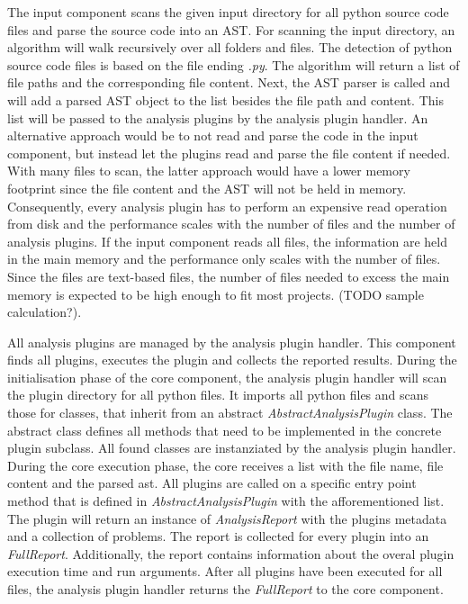 The input component scans the given input directory for all python source code files and parse the source code into an AST. 
For scanning the input directory, an algorithm will walk recursively over all folders and files. The detection of python source code files is based on the file ending \textit{.py}. The algorithm will return a list of file paths and the corresponding file content. 
Next, the AST parser is called and will add a parsed AST object to the list besides the file path and content. This list will be passed to the analysis plugins by the analysis plugin handler.  An alternative approach would be to not read and parse the code in the input component, but instead let the plugins read and parse the file content if needed. With many files to scan, the latter approach would have a lower memory footprint since the file content and the AST will not be held in memory. Consequently, every analysis plugin has to perform an expensive read operation from disk and the performance scales with the number of files and the number of analysis plugins. 
If the input component reads all files, the information are held in the main memory and the performance only scales with the number of files. Since the files are text-based files, the number of files needed to excess the main memory is expected to be high enough to fit most projects. (TODO sample calculation?).

All analysis plugins are managed by the analysis plugin handler. This component finds all plugins, executes the plugin and collects the reported results.
During the initialisation phase of the core component, the analysis plugin handler will scan the plugin directory for all python files. It imports all python files and scans those for classes, that inherit from an abstract \textit{AbstractAnalysisPlugin} class. The abstract class defines all methods that need to be implemented in the concrete plugin subclass. All found classes are instanziated by the analysis plugin handler.
During the core execution phase, the core receives a list with the file name, file content and the parsed ast. All plugins are called on a specific entry point method that is defined in \textit{AbstractAnalysisPlugin} with the afforementioned list. The plugin will return an instance of \textit{AnalysisReport} with the plugins metadata and a collection of problems. The report is collected for every plugin into an \textit{FullReport}. Additionally, the report contains information about the overal plugin execution time and run arguments. After all plugins have been executed for all files, the analysis plugin handler returns the \textit{FullReport} to the core component.

